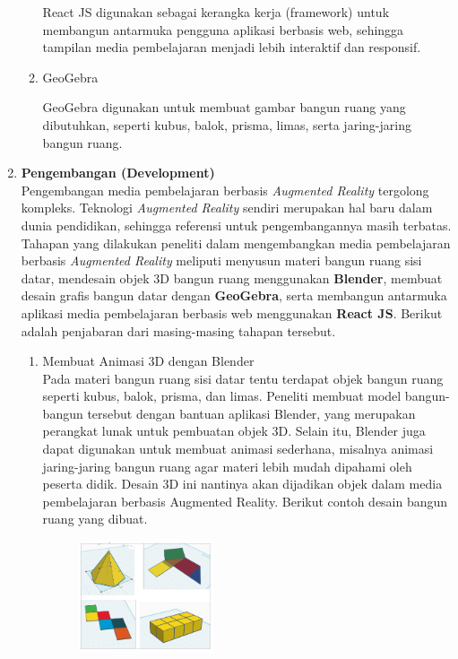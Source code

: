 \documentclass[12pt]{article}
\begin{document}
\begin{enumerate}[leftmargin=1cm, label=\arabic*.]
\begin{enumerate}[label=\alph*)]
        React JS digunakan sebagai kerangka kerja (framework) untuk membangun antarmuka pengguna aplikasi berbasis web, sehingga tampilan media pembelajaran menjadi lebih interaktif dan responsif.

        \item GeoGebra

        GeoGebra digunakan untuk membuat gambar bangun ruang yang dibutuhkan, seperti kubus, balok, prisma, limas, serta jaring-jaring bangun ruang.

    \end{enumerate}

    \item \textbf{Pengembangan (Development)}\\
    \hspace*{1cm}Pengembangan media pembelajaran berbasis \textit{Augmented Reality} tergolong kompleks. Teknologi \textit{Augmented Reality} sendiri merupakan hal baru dalam dunia pendidikan, sehingga referensi untuk pengembangannya masih terbatas.
    Tahapan yang dilakukan peneliti dalam mengembangkan media pembelajaran berbasis \textit{Augmented Reality} meliputi menyusun materi bangun ruang sisi datar, mendesain objek 3D bangun ruang menggunakan \textbf{Blender}, membuat desain grafis bangun datar dengan \textbf{GeoGebra}, serta membangun antarmuka aplikasi media pembelajaran berbasis web menggunakan \textbf{React JS}.
    Berikut adalah penjabaran dari masing-masing tahapan tersebut.
    \begin{enumerate}[label=\arabic*)]
        \item Membuat Animasi 3D dengan Blender \\
        \hspace*{1cm}Pada materi bangun ruang sisi datar tentu terdapat objek bangun ruang seperti kubus, balok, prisma, dan limas. Peneliti membuat model bangun-bangun tersebut dengan bantuan aplikasi Blender, yang merupakan perangkat lunak untuk pembuatan objek 3D. Selain itu, Blender juga dapat digunakan untuk membuat animasi sederhana, misalnya animasi jaring-jaring bangun ruang agar materi lebih mudah dipahami oleh peserta didik. Desain 3D ini nantinya akan dijadikan objek dalam media pembelajaran berbasis Augmented Reality. Berikut contoh desain bangun ruang yang dibuat.
        \begin{figure}[H]
            \centering
            \includegraphics[width=0.4\textwidth]{images/bangun-dan-jaring.png}

\end{figure}
\end{enumerate}
\end{enumerate}
\end{document}
